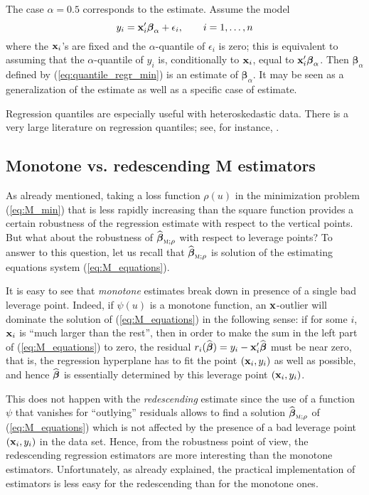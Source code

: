 The case $\alpha=0.5$ corresponds to the  estimate. Assume the model
\[
    y_{i} = \mathbf x_{i}' \boldsymbol\beta_{\alpha} + \epsilon_{i},
    \qquad i = 1, \dots, n
\]
where the $\mathbf x_{i}$'s are fixed and the $\alpha$-quantile of
$\epsilon_{i}$ is zero; this is equivalent to assuming that the
$\alpha$-quantile of $y_{i}$ is, conditionally to $\mathbf x_{i}$, equal to
$\mathbf x_{i}'\boldsymbol\beta_{\alpha}$. Then $\widehat
{\boldsymbol\beta}_{\alpha}$ defined by (\ref{eq:quantile_regr_min}) is an
estimate of $\boldsymbol\beta_{\alpha}$. It may be seen as a generalization of
the  estimate as well as a specific case of  estimate.

Regression quantiles are especially useful with heteroskedastic data. There is
a very large literature on regression quantiles; see, for instance,
\citet{Koenker:2005}.

\subsection{Monotone vs. redescending M estimators}

As already mentioned, taking a loss function $\rho(u)$ in the minimization
problem (\ref{eq:M_min}) that is less rapidly increasing than the square
function provides a certain robustness of the regression  estimate with
respect to the vertical points. But what about the robustness of
$\sthat{\boldsymbol\beta}_{\stsc{M};\rho}$ with respect to leverage points? To
answer to this question, let us recall that
$\sthat{\boldsymbol\beta}_{\stsc{M};\rho}$ is solution of the estimating
equations system (\ref{eq:M_equations}).

It is easy to see that \emph{monotone}  estimates break down in
presence of a single bad leverage point. Indeed, if $\psi(u)$ is a monotone
function, an $\mathbf x$-outlier will dominate the solution of
(\ref{eq:M_equations}) in the following sense: if for some $i$, $\mathbf x_{i}$
is “much larger than the rest”, then in order to make the sum in the left part
of (\ref{eq:M_equations}) to zero, the residual
$r_{i}(\widehat{\boldsymbol\beta}) = y_{i} -
\mathbf x_{i}'\widehat{\boldsymbol\beta}$ must be near zero, that is, the
regression hyperplane has to fit the point $(\mathbf x_{i}, y_{i})$ as well as
possible, and hence $\widehat{\boldsymbol\beta}$ is essentially determined by
this leverage point $(\mathbf x_{i}, y_{i})$.

This does not happen with the \emph{redescending}  estimate since the
use of a function $\psi$ that vanishes for “outlying” residuals allows to find
a solution $\widehat{\boldsymbol\beta}_{\stsc{M};\rho}$ of
(\ref{eq:M_equations}) which is not affected by the presence of a bad leverage
point $(\mathbf x_{i}, y_{i})$ in the data set. Hence, from the robustness
point of view, the redescending regression  estimators are more interesting
than the monotone  estimators. Unfortunately, as already explained, the
practical implementation of  estimators is less easy for the
redescending than for the monotone ones.

